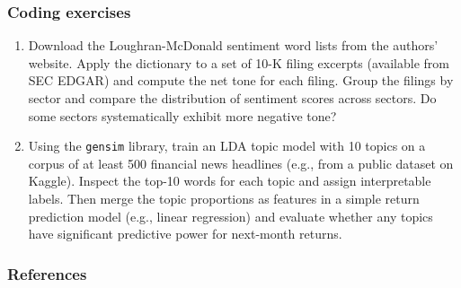 \subsubsection{Coding exercises}

\begin{enumerate}
\item Download the Loughran-McDonald sentiment word lists from the authors'
website. Apply the dictionary to a set of 10-K filing excerpts (available
from SEC EDGAR) and compute the net tone for each filing. Group the
filings by sector and compare the distribution of sentiment scores
across sectors. Do some sectors systematically exhibit more negative tone?
\item Using the \texttt{gensim} library, train an LDA topic model with 10 topics on a
corpus of at least 500 financial news headlines (e.g., from a public
dataset on Kaggle). Inspect the top-10 words for each topic and assign
interpretable labels. Then merge the topic proportions as features in a
simple return prediction model (e.g., linear regression) and evaluate
whether any topics have significant predictive power for next-month
returns.
\end{enumerate}

\subsubsection{References}